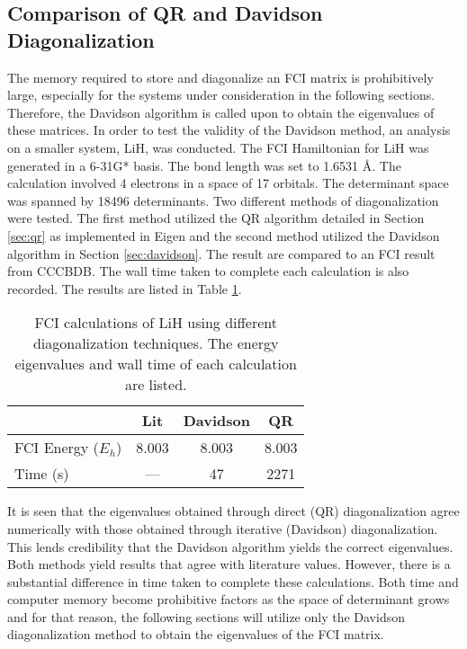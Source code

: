 \documentclass[final,3p,times,twocolumn]{elsarticle}
\begin{document}
\subsection{Comparison of QR and Davidson Diagonalization}
The memory required to store and diagonalize an FCI matrix is prohibitively large, especially for the systems under consideration in the following sections. Therefore, the Davidson algorithm is called upon to obtain the eigenvalues of these matrices. In order to test the validity of the Davidson method, an analysis on a smaller system, LiH, was conducted. The FCI Hamiltonian for LiH was generated in a 6-31G* basis. The bond length was set to 1.6531 \AA. The calculation involved 4 electrons in a space of 17 orbitals. The determinant space was spanned by 18496 determinants. Two different methods of diagonalization were tested. The first method utilized the QR algorithm detailed in Section \ref{sec:qr} as implemented in Eigen\cite{eigen} and the second method utilized the Davidson algorithm in Section \ref{sec:davidson}. The result are compared to an FCI result from CCCBDB.\cite{cccbdb} The wall time taken to complete each calculation is also recorded. The results are listed in Table \ref{tab:lihresults}.

\begin{table}
\centering
\begin{tabular}{l|ccc} \hline\hline
& Lit\cite{cccbdb} & Davidson & QR \\ \hline
FCI Energy ($E_h$) & 8.003 & 8.003 & 8.003 \\
Time (s) & --- & 47 & 2271 \\ \hline\hline
\end{tabular}
\caption{FCI calculations of LiH using different diagonalization techniques. The energy eigenvalues and wall time of each calculation are listed.}
\label{tab:lihresults}
\end{table}

It is seen that the eigenvalues obtained through direct (QR) diagonalization agree numerically with those obtained through iterative (Davidson) diagonalization. This lends credibility that the Davidson algorithm yields the correct eigenvalues. Both methods yield results that agree with literature values. However, there is a substantial difference in time taken to complete these calculations. Both time and computer memory become prohibitive factors as the space of determinant grows and for that reason, the following sections will utilize only the Davidson diagonalization method to obtain the eigenvalues of the FCI matrix.
\end{document}
